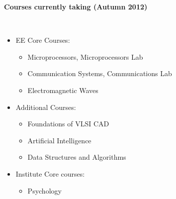 \documentclass[a4paper,11pt]{article}
\newcommand{\isep}{-2 pt}
\newcommand{\lsep}{-0.5cm}
\newcommand{\resheading}[1]{{\small \colorbox{mygrey}{\begin{minipage}{0.975\textwidth}{\textbf{#1 \vphantom{p\^{E}}}}\end{minipage}}}}
\begin{document}
\resheading{\textbf{\large Courses currently taking (Autumn 2012)}}\\[\lsep]
  \begin{comment}
  \item \textbf{Courses Taken}	
	\begin{itemize}\itemsep \isep
	  \item Calculus, Linear Algebra, Differential Equations.
	  \item Electricity and Magnetism, Chemistry. \\
	  \item Data Analysis and Interpretation, Computer Programming and Utilization.
	  \item Introduction to Electrical Systems, Introduction to Electronics 
	  \item Workshop Practice, Engineering Drawing, Physics Lab, Chemistry Lab. \\
	  \item Complex Analysis, Differential Equations, Economics 
	  \item Network Theory, Electronic Devices and Circuits. \\
	  \item Discrete Structures, A First Course in Optimization.
	  \item Experimental and Measurement Laboratory, Electronic Devices Lab.
	\end{itemize}
	\end{comment}
 	\begin{itemize} \itemsep \isep
 	    \item EE Core Courses: \\[-0.6cm]
 	    \begin{itemize}\itemsep \isep
 	        \item Microprocessors, Microprocessors Lab
 	        \item Communication Systems, Communications Lab
 	        \item Electromagnetic Waves
 	    \end{itemize}
 	    \item Additional Courses: \\[-0.6cm]
 	    \begin{itemize}\itemsep \isep
 	        \item Foundations of VLSI CAD
 	        \item Artificial Intelligence
 	        \item Data Structures and Algorithms
 	    \end{itemize}
 	    \item Institute Core courses: \\[-0.6cm]
 	    \begin{itemize}\itemsep \isep
 	        \item Psychology
 	    \end{itemize}
 	\end{itemize}
\end{document}
